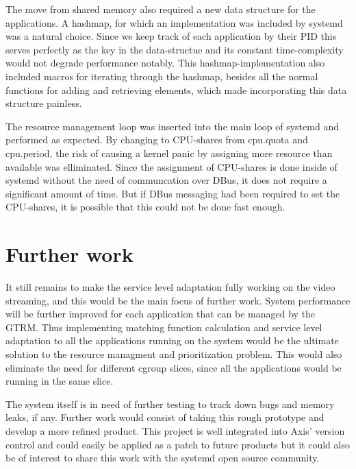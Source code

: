 \documentclass[nobiblatex]{LTHthesis}
\begin{document}
The move from shared memory also required a new data structure for the applications. A hashmap, for which an implementation was included by systemd was a natural choice. Since we keep track of each application by their PID this serves perfectly as the key in the data-structue and its constant time-complexity would not degrade performance notably. This hashmap-implementation also included macros for iterating through the hashmap, besides all the normal functions for adding and retrieving elements, which made incorporating this data structure painless. 

The resource management loop was inserted into the main loop of systemd and performed as expected. By changing to CPU-shares from cpu.quota and cpu.period, the risk of causing a kernel panic by assigning more resource than available was elliminated. Since the assignment of CPU-shares is done inside of systemd without the need of communcation over DBus, it does not require a significant amount of time. But if DBus messaging had been required to set the CPU-shares, it is possible that this could not be done fast enough.

\section{Further work}
It still remains to make the service level adaptation fully working on the video streaming, and this would be the main focus of further work. System performance will be further improved for each application that can be managed by the GTRM. Thus implementing matching function calculation and service level adaptation to all the applications running on the system would be the ultimate solution to the resource managment and prioritization problem. This would also eliminate the need for different cgroup slices, since all the applications would be running in the same slice.

The system itself is in need of further testing to track down bugs and memory leaks, if any. Further work would consist of taking this rough prototype and develop a more refined product. This project is well integrated into Axis' version control and could easily be applied as a patch to future products but it could also be of interest to share this work with the systemd open source community.






\appendix
\end{document}
